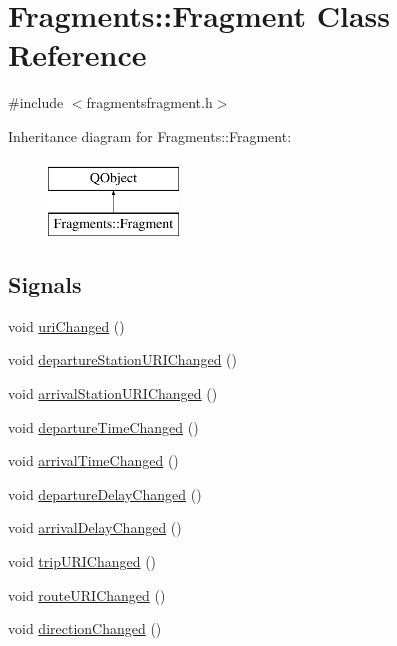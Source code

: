 \hypertarget{classFragments_1_1Fragment}{}\section{Fragments\+:\+:Fragment Class Reference}
\label{classFragments_1_1Fragment}


{\ttfamily \#include $<$fragmentsfragment.\+h$>$}

Inheritance diagram for Fragments\+:\+:Fragment\+:\begin{figure}[H]
\begin{center}
\leavevmode
\includegraphics[height=2.000000cm]{classFragments_1_1Fragment}
\end{center}
\end{figure}
\subsection*{Signals}
\begin{DoxyCompactItemize}
\item 
void \mbox{\hyperlink{classFragments_1_1Fragment_ad1d14027cf24dea3982576f160ed61e4}{uri\+Changed}} ()
\item 
void \mbox{\hyperlink{classFragments_1_1Fragment_add02014358cc604a4d5473ff317b9048}{departure\+Station\+U\+R\+I\+Changed}} ()
\item 
void \mbox{\hyperlink{classFragments_1_1Fragment_ab3afd2b0cd0d1fe7a0dc15cd7c358195}{arrival\+Station\+U\+R\+I\+Changed}} ()
\item 
void \mbox{\hyperlink{classFragments_1_1Fragment_a3b4eaf02e54dcf202c5b740c6e3946e6}{departure\+Time\+Changed}} ()
\item 
void \mbox{\hyperlink{classFragments_1_1Fragment_a25530427fe0bc865f7595221a8284ef2}{arrival\+Time\+Changed}} ()
\item 
void \mbox{\hyperlink{classFragments_1_1Fragment_a2f4407d54a869e2a45b514525c582016}{departure\+Delay\+Changed}} ()
\item 
void \mbox{\hyperlink{classFragments_1_1Fragment_a586fd07ea637247637da6971555ed92b}{arrival\+Delay\+Changed}} ()
\item 
void \mbox{\hyperlink{classFragments_1_1Fragment_a80a2dcba09a29a4d375b8900bb6b6be0}{trip\+U\+R\+I\+Changed}} ()
\item 
void \mbox{\hyperlink{classFragments_1_1Fragment_ab220e9fef71bf161e14769afc61f0499}{route\+U\+R\+I\+Changed}} ()
\item 
void \mbox{\hyperlink{classFragments_1_1Fragment_a5956fb561df3842d6d292b46fc16bec2}{direction\+Changed}} ()
\end{DoxyCompactItemize}
